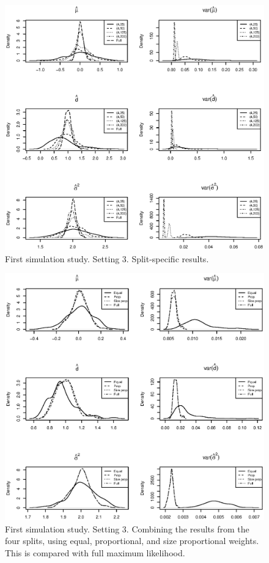 \documentclass[11pt,a5paper,twoside]{book}
\begin{document}
{\begin{figure}[!t]
\centering
\includegraphics[width=\textwidth]{aCS_diff2.eps}
\caption{\small \linespread{1.1} First simulation study. Setting 3. Split-specific results. \label{CS_diff2}}
\end{figure}
\begin{figure}[!t]
\centering
\includegraphics[width=\textwidth]{aCS_diff_comb2.eps}
\caption{\small \linespread{1.1} First simulation study. Setting 3. Combining the results from the four splits, using equal, proportional, and size proportional weights. This is compared with full maximum likelihood.} \label{CS_diff_comb2}
\end{figure}


}
\end{document}
